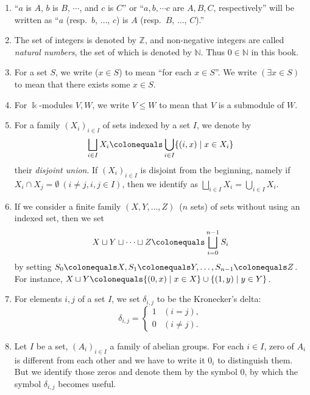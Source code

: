 \documentclass{surv-l}
\numberwithin{equation}{chapter}
\numberwithin{figure}{chapter}
\theoremstyle{plain}
\theoremstyle{definition}
\theoremstyle{remark}
\begin{document}
\begin{enumerate}
\item
``$a$ is $A$, $b$ is $B$, $\cdots$, and $c$ is $C$'' or
``$a, b, \cdots c$ are $A, B, C$, respectively'' will be written as
``$a$ (resp.\ $b$, $\dots$, $c$) is $A$ (resp.\ $B$, $\dots$, $C$).''
\item
The set of integers is denoted by $\mathbb{Z}$, and non-negative integers are called
\emph{natural numbers}, the set of which is denoted by $\mathbb{N}$.
Thus $0 \in \mathbb{N}$ in this book.
\item
For a set $S$, we write ($x \in S$) to mean ``for each $x \in S$''.
We write $(\exists x \in S)$ to mean that there exists some $x \in S$.
\item
For $\Bbbk$-modules $V, W$, we write $V \le W$ to mean
that $V$ is a submodule of $W$.
\item
For a family $(X_i)_{i \in I}$ of sets indexed by a set $I$,
we denote by
\begin{equation*}
\bigsqcup_{i \in I} X_i\colonequals  \bigcup_{i \in I} \{(i,x) \mid x \in X_i\}
\end{equation*}
their \emph{disjoint union}.
If $(X_i)_{i \in I}$ is disjoint from the beginning, namely if
$X_i \cap X_j = \emptyset\ (i \ne j, i, j \in I)$, then we identify as
$
\bigsqcup_{i \in I} X_i = \bigcup_{i \in I} X_i.
$
\item
If we consider a finite family $(X, Y, \dots, Z)$\ ($n$ sets)
of sets without using an indexed set,
then we set
\begin{equation*}
X \sqcup Y \sqcup \dots \sqcup Z\colonequals  \bigsqcup_{i = 0}^{n-1} S_i
\end{equation*}
by setting $S_0\colonequals  X, S_1\colonequals  Y, \dots, S_{n-1}\colonequals  Z$.
For instance,
$X \sqcup Y\colonequals  \{(0,x) \mid x \in X\} \cup \{(1,y) \mid y \in Y\}$.
\item
For elements $i, j$ of a set $I$, we set $\delta_{i,j}$ to be the Kronecker's delta:
\[
\delta_{i,j} = \begin{cases} 1 & (i = j),\\0 & (i \ne j).\end{cases}
\]
\item\label{ntn:zero}
Let $I$ be a set, $(A_i)_{i\in I}$ a family of abelian groups.
For each $i \in I$, zero of $A_i$ is different from each other and
we have to write it $0_i$ to distinguish them.
But we identify those zeros and denote them by the symbol 0,
by which the symbol $\delta_{i,j}$ becomes useful.

\end{enumerate}
\end{document}
